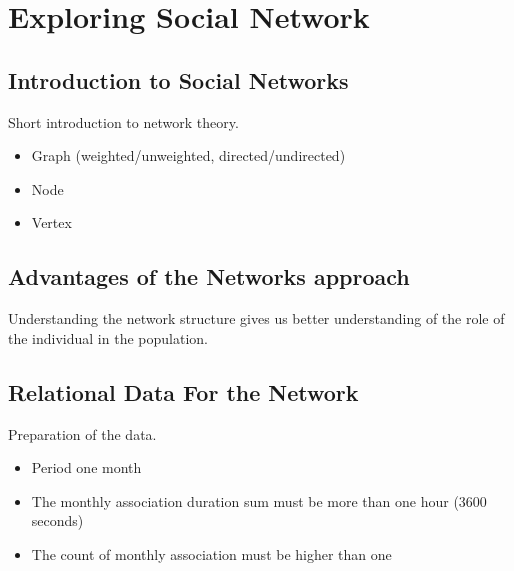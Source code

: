 \newpage
\section{Exploring Social Network}
\label{sec:netexp}

\subsection{Introduction to Social Networks}
\label{sec:introsocnet}

Short introduction to network theory. 

\begin{itemize} 
	\item Graph (weighted/unweighted, directed/undirected)
	\item Node
	\item Vertex
\end{itemize}

\subsection{Advantages of the Networks approach}
\label{sec:advantnetappr}

Understanding the network structure gives us better understanding of the role of the individual in the population.

\subsection{Relational Data For the Network}
\label{subsec:datafilter}

Preparation of the data.


\begin{itemize} 
	\item Period one month
	\item The monthly association duration sum must be more than one hour (3600 seconds)
	\item The count of monthly association must be higher than one
\end{itemize}

